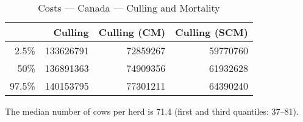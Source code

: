 \documentclass{article}\usepackage[]{graphicx}\usepackage[]{color}
\begin{document}
\begin{table}[ht]
\centering
\begin{tabular}{rrrr}
  \hline
 & Culling & Culling (CM) & Culling (SCM) \\ 
  \hline
2.5\% & 133626791 & 72859267 & 59770760 \\ 
  50\% & 136891363 & 74909356 & 61932628 \\ 
  97.5\% & 140153795 & 77301211 & 64390240 \\ 
   \hline
\end{tabular}
\caption{Costs --- Canada --- Culling and Mortality} 
\label{tab:canada:c}
\end{table}


The median number of cows per herd is 71.4 (first
and third quantiles: 37--81).
\clearpage
\end{document}
